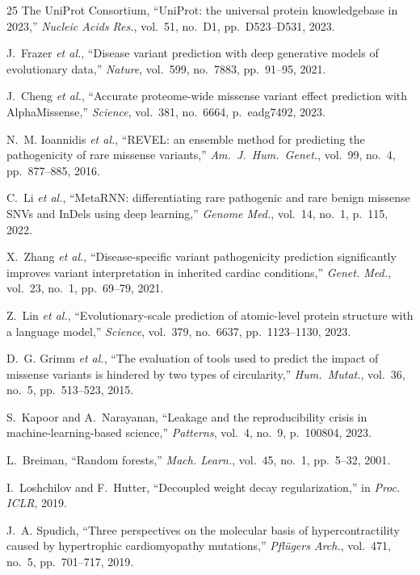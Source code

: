 \documentclass[conference]{IEEEtran}
\begin{document}
\begin{thebibliography}{25}
The UniProt Consortium,
``UniProt: the universal protein knowledgebase in 2023,''
\textit{Nucleic Acids Res.}, vol.~51, no.~D1,
pp.~D523--D531, 2023.

J.~Frazer \textit{et al.},
``Disease variant prediction with deep generative models of
evolutionary data,''
\textit{Nature}, vol.~599, no.~7883, pp.~91--95, 2021.

J.~Cheng \textit{et al.},
``Accurate proteome-wide missense variant effect prediction with
AlphaMissense,''
\textit{Science}, vol.~381, no.~6664, p.~eadg7492, 2023.

N.~M. Ioannidis \textit{et al.},
``REVEL: an ensemble method for predicting the pathogenicity of
rare missense variants,''
\textit{Am.\ J.\ Hum.\ Genet.}, vol.~99, no.~4,
pp.~877--885, 2016.

C.~Li \textit{et al.},
``MetaRNN: differentiating rare pathogenic and rare benign missense
SNVs and InDels using deep learning,''
\textit{Genome Med.}, vol.~14, no.~1, p.~115, 2022.

X.~Zhang \textit{et al.},
``Disease-specific variant pathogenicity prediction significantly
improves variant interpretation in inherited cardiac conditions,''
\textit{Genet. Med.}, vol.~23, no.~1, pp.~69--79, 2021.

Z.~Lin \textit{et al.},
``Evolutionary-scale prediction of atomic-level protein structure
with a language model,''
\textit{Science}, vol.~379, no.~6637, pp.~1123--1130, 2023.

D.~G. Grimm \textit{et al.},
``The evaluation of tools used to predict the impact of missense
variants is hindered by two types of circularity,''
\textit{Hum.\ Mutat.}, vol.~36, no.~5, pp.~513--523, 2015.

S.~Kapoor and A.~Narayanan,
``Leakage and the reproducibility crisis in machine-learning-based
science,''
\textit{Patterns}, vol.~4, no.~9, p.~100804, 2023.

L.~Breiman,
``Random forests,''
\textit{Mach. Learn.}, vol.~45, no.~1, pp.~5--32, 2001.

I.~Loshchilov and F.~Hutter,
``Decoupled weight decay regularization,''
in \textit{Proc. ICLR}, 2019.

J.~A. Spudich,
``Three perspectives on the molecular basis of hypercontractility
caused by hypertrophic cardiomyopathy mutations,''
\textit{Pfl\"{u}gers Arch.}, vol.~471, no.~5, pp.~701--717, 2019.


\end{thebibliography}
\end{document}
